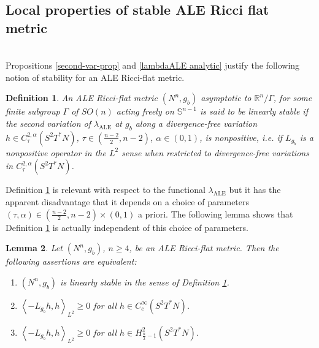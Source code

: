 \documentclass[a4paper,11pt,reqno]{amsart}
\newtheorem{defn}{Definition}[section]
\newtheorem{lemma}[defn]{Lemma}
\def\RR{\mathbb{R}}
\numberwithin{equation}{section}
\begin{document}
	\subsection{Local properties of stable ALE Ricci flat metric}~~\\
	
	Propositions \ref{second-var-prop} and \ref{lambdaALE analytic} justify the following notion of stability for an ALE Ricci-flat metric.
	\begin{defn}\label{defn-stable}
		An ALE Ricci-flat metric $(N^n,g_b)$ asymptotic to $\RR^n\slash\Gamma$, for some finite subgroup $\Gamma$ of $SO(n)$ acting freely on $\mathbb{S}^{n-1}$ is said to be \emph{linearly stable} if the second variation of $\lambda_{\operatorname{ALE}}$ at $g_b$ along a divergence-free variation $h\in C^{2,\alpha}_{\tau}(S^2T^*N)$, $\tau\in\left(\frac{n-2}{2},n-2\right)$, $\alpha\in(0,1)$, is nonpositive, i.e. if $L_{g_b}$ is a nonpositive operator in the $L^2$ sense when restricted to divergence-free variations in $ C^{2,\alpha}_{\tau}(S^2T^*N)$.
	\end{defn}
	
	Definition \ref{defn-stable} is relevant with respect to the functional $\lambda_{\operatorname{ALE}}$ but it has the apparent disadvantage that it depends on a choice of parameters $(\tau,\alpha)\in\left(\frac{n-2}{2},n-2\right)\times(0,1)$ a priori. The following lemma shows that Definition \ref{defn-stable} is actually independent of this choice of parameters.
	
	\begin{lemma}\label{lemma-equiv-def-stable}
	Let $(N^n,g_b)$, $n\geq 4$, be an ALE Ricci-flat metric. Then the following assertions are equivalent:
	\begin{enumerate}
	\item \label{first-def-sta}$(N^n,g_b)$ is linearly stable in the sense of Definition \ref{defn-stable}.\\
	
	\item \label{sec-def-sta}$\left<-L_{g_b}h,h\right>_{L^2}\geq 0$ for all $h\in C_c^{\infty}(S^2T^*N)$.\\
	
	\item \label{thir-def-sta}$\left<-L_{g_b}h,h\right>_{L^2}\geq 0$ for all $h\in H^2_{\frac{n}{2}-1}(S^2T^*N)$.
	\end{enumerate} 
	\end{lemma}
	
\end{document}
